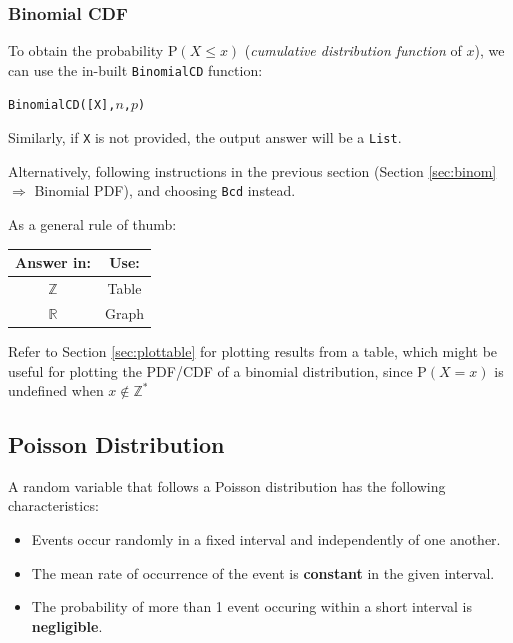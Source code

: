 \documentclass[a5paper]{memoir}
\def\code#1{\texttt{#1}}
\newcommand{\addtoindex}[1]{#1\index{#1}}
\begin{document}
\subsubsection{Binomial CDF}

To obtain the probability $\textrm{P}(X \leq x)$ (\textit{cumulative distribution function} of $x$), we can use the in-built \code{\addtoindex{BinomialCD}} function:

\begin{center}
	\code{BinomialCD([X],$n$,$p$)}
\end{center}

Similarly, if \code{X} is not provided, the output answer will be a \code{List}.

Alternatively, following instructions in the previous section (Section \ref{sec:binom} $\Rightarrow$ Binomial PDF), and choosing \code{Bcd} instead. 

As a general rule of thumb:
\begin{center}
	\setlength{\tabcolsep}{10pt}
	\renewcommand{\arraystretch}{1.1}
	\begin{tabular}{|c|c|}
		\hline
		Answer in:		& Use: \\
		\hline
		$\mathbb{Z}$	& Table \\
		\hline
		$\mathbb{R}$	& Graph \\
		\hline
	\end{tabular}
\end{center}

Refer to Section \ref{sec:plottable} for plotting results from a table, which might be useful for plotting the PDF/CDF of a binomial distribution, since $\mathrm{P}(X=x)$ is undefined when $x \notin \mathbb{Z}^*$

\subsection{Poisson Distribution} \label{sec:poisson}
A random variable that follows a Poisson distribution has the following characteristics:
\begin{itemize}
	\item Events occur randomly in a fixed interval and independently of one another.
	\item The mean rate of occurrence of the event is \textbf{constant} in the given interval.
	\item The probability of more than 1 event occuring within a short interval is \textbf{negligible}. 
\end{itemize}
\end{document}
